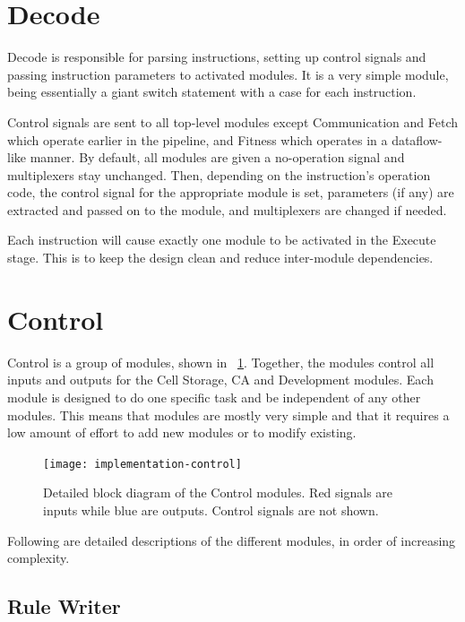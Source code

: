 \section{Decode}

Decode is responsible for parsing instructions, setting up control signals and passing instruction parameters to activated modules.
It is a very simple module, being essentially a giant switch statement with a case for each instruction.

Control signals are sent to all top-level modules except Communication and Fetch which operate earlier in the pipeline, and Fitness which operates in a dataflow-like manner.
By default, all modules are given a no-operation signal and multiplexers stay unchanged.
Then, depending on the instruction's operation code, the control signal for the appropriate module is set, parameters (if any) are extracted and passed on to the module, and multiplexers are changed if needed.

Each instruction will cause exactly one module to be activated in the Execute stage.
This is to keep the design clean and reduce inter-module dependencies.


\section{Control}

Control is a group of modules, shown in \figurename~\ref{fig:implementation-control}.
Together, the modules control all inputs and outputs for the Cell Storage, CA and Development modules.
Each module is designed to do one specific task and be independent of any other modules.
This means that modules are mostly very simple and that it requires a low amount of effort to add new modules or to modify existing.

\begin{figure}[!ht]
    \centering
    \texttt{[image: implementation-control]}
    \caption[Control modules]{
        Detailed block diagram of the Control modules.
        Red signals are inputs while blue are outputs.
        Control signals are not shown.
    }
    \label{fig:implementation-control}
\end{figure}

Following are detailed descriptions of the different modules, in order of increasing complexity.

\subsection{Rule Writer}

